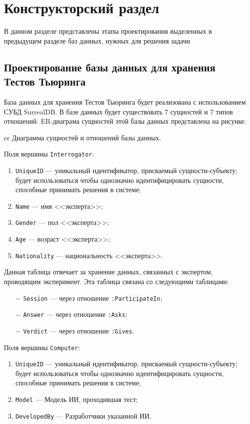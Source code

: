 \section{Конструкторский раздел}
В данном разделе представлены этапы проектирования выделенных в  
предыдущем разделе баз данных, нужных для решения задачи

\subsection{Проектирование базы данных для хранения Тестов Тьюринга}  
База данных для хранения Тестов Тьюринга будет реализована с использованием СУБД SurrealDB. В базе данных будет существовать 7 сущностей и 7 типов отношений. ER-диаграма сущностей этой базы данных представлена на рисунке.  

\img{100mm}
{er}
{Диаграмма сущностей и отношений базы данных.}

Поля вершины \texttt{Interrogator}: 
\begin{enumerate}
    \item \texttt{UniqueID} --- уникальный идентификатор, присваемый сущности-субъекту; будет использоваться чтобы однозначно идентифицировать сущности, способные принимать решения в системе;
    \item \texttt{Name} --- имя <<эксперта>>;
    \item \texttt{Gender} --- пол <<эксперта>>;
    \item \texttt{Age} --- возраст <<эксперта>>;
    \item \texttt{Nationality} --- национальность <<эксперта>>.
\end{enumerate}

Данная таблица отвечает за хранение данных, связанных с экспертом, проводящим эксперимент.
Эта таблица связана со следующими таблицами:
\begin{itemize}
    \item[$-$] \texttt{Session} --- через отношение \texttt{:ParticipateIn};
    \item[$-$] \texttt{Answer} --- через отношение \texttt{:Asks};
    \item[$-$] \texttt{Verdict} --- через отношение \texttt{:Gives}.
\end{itemize}

Поля вершины \texttt{Computer}:
\begin{enumerate}
    \item \texttt{UniqueID} --- уникальный идентификатор, присваемый сущности-субъекту; будет использоваться чтобы однозначно идентифицировать сущности, способные принимать решения в системе;
    \item \texttt{Model} --- Модель ИИ, проходившая тест;
    \item \texttt{DevelopedBy} --- Разработчики указанной ИИ.
\end{enumerate}

